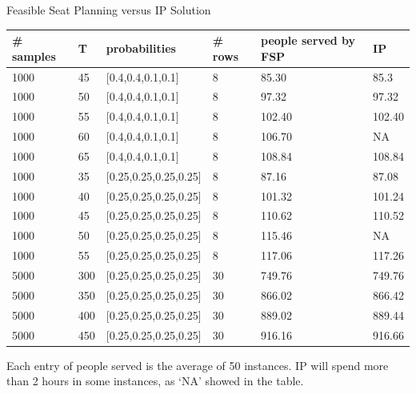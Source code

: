\begin{frame}{Feasible Seat Planning versus IP Solution}
  \scriptsize
  \begin{table}[ht]
      \begin{tabular}{|l|l|l|l|l|l|}
      \hline
      \# samples & T & probabilities & \# rows & people served by FSP & IP \\
      \hline
      1000  & 45  & [0.4,0.4,0.1,0.1] & 8 & 85.30 & 85.3 \\
      1000  & 50  & [0.4,0.4,0.1,0.1] & 8 & 97.32 & 97.32 \\
      1000  & 55  & [0.4,0.4,0.1,0.1] & 8 & 102.40 & 102.40  \\ %
      1000  & 60  & [0.4,0.4,0.1,0.1] & 8 & 106.70 & NA  \\
      1000  & 65  & [0.4,0.4,0.1,0.1] & 8 & 108.84 & 108.84 \\
      \hline
      1000  & 35  & [0.25,0.25,0.25,0.25] & 8 & 87.16 & 87.08 \\
      1000  & 40  & [0.25,0.25,0.25,0.25] & 8 & 101.32 & 101.24 \\
      1000  & 45  & [0.25,0.25,0.25,0.25] & 8 & 110.62 & 110.52 \\
      1000  & 50  & [0.25,0.25,0.25,0.25] & 8 & 115.46 & NA \\
      1000  & 55  & [0.25,0.25,0.25,0.25] & 8 & 117.06 & 117.26 \\
      \hline
      5000  & 300  & [0.25,0.25,0.25,0.25] & 30 & 749.76 & 749.76 \\
      5000  & 350  & [0.25,0.25,0.25,0.25] & 30 & 866.02 & 866.42 \\
      5000  & 400  & [0.25,0.25,0.25,0.25] & 30 & 889.02 & 889.44 \\
      5000  & 450  & [0.25,0.25,0.25,0.25] & 30 & 916.16 & 916.66 \\
      \hline
      \end{tabular}
  \end{table}

Each entry of people served is the average of 50 instances.
IP will spend more than 2 hours in some instances, as `NA' showed in the table.
\end{frame}

